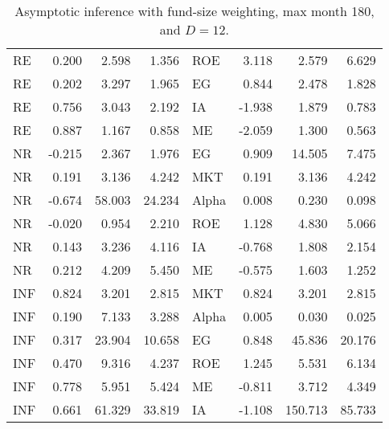 \begin{table}[ht]
{\begin{tabular}{lrrrlrrr}
			RE & 0.200 & 2.598 & 1.356 & ROE & 3.118 & 2.579 & 6.629 \\ 
			RE & 0.202 & 3.297 & 1.965 & EG & 0.844 & 2.478 & 1.828 \\ 
			RE & 0.756 & 3.043 & 2.192 & IA & -1.938 & 1.879 & 0.783 \\ 
			RE & 0.887 & 1.167 & 0.858 & ME & -2.059 & 1.300 & 0.563 \\ 
			\hline
			NR & -0.215 & 2.367 & 1.976 & EG & 0.909 & 14.505 & 7.475 \\ 
			NR & 0.191 & 3.136 & 4.242 & MKT & 0.191 & 3.136 & 4.242 \\ 
			NR & -0.674 & 58.003 & 24.234 & Alpha & 0.008 & 0.230 & 0.098 \\ 
			NR & -0.020 & 0.954 & 2.210 & ROE & 1.128 & 4.830 & 5.066 \\ 
			NR & 0.143 & 3.236 & 4.116 & IA & -0.768 & 1.808 & 2.154 \\ 
			NR & 0.212 & 4.209 & 5.450 & ME & -0.575 & 1.603 & 1.252 \\ 
			\hline
			INF & 0.824 & 3.201 & 2.815 & MKT & 0.824 & 3.201 & 2.815 \\ 
			INF & 0.190 & 7.133 & 3.288 & Alpha & 0.005 & 0.030 & 0.025 \\ 
			INF & 0.317 & 23.904 & 10.658 & EG & 0.848 & 45.836 & 20.176 \\ 
			INF & 0.470 & 9.316 & 4.237 & ROE & 1.245 & 5.531 & 6.134 \\ 
			INF & 0.778 & 5.951 & 5.424 & ME & -0.811 & 3.712 & 4.349 \\ 
			INF & 0.661 & 61.329 & 33.819 & IA & -1.108 & 150.713 & 85.733 \\ 
			\hline
			\hline
		\end{tabular}
	}
	\caption{Asymptotic inference with fund-size weighting, max month 180, and $D=12$.} 
	\label{tab:ai_180_FW_VYP_SL}
\end{table}


